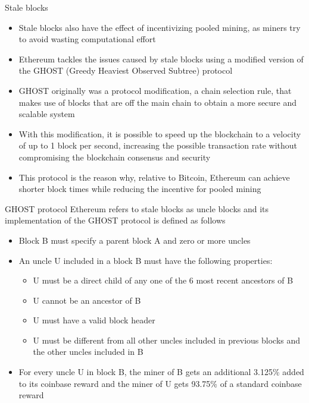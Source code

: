 \documentclass[10pt]{beamer}
\begin{document}

\begin{frame}{Stale blocks}
	\begin{itemize}

		\item Stale blocks also have the effect of incentivizing pooled mining, as miners try to avoid wasting computational effort
		\item Ethereum tackles the issues caused by stale blocks using a modified version of the GHOST (Greedy Heaviest Observed Subtree) protocol
		\item GHOST originally was a protocol modification, a chain selection rule, that makes use of blocks that are off the main chain to obtain a more secure and scalable system
		\item With this modification, it is possible to speed up the blockchain to a velocity of up to 1 block per second, increasing the possible transaction rate without compromising the blockchain consensus and security
		\item This protocol is the reason why, relative to Bitcoin, Ethereum can achieve shorter block times while reducing the incentive for pooled mining
	\end{itemize}
\end{frame}



\begin{frame}{GHOST protocol}
	Ethereum refers to stale blocks as uncle blocks and its implementation of the GHOST protocol is defined as follows
	\begin{itemize}
		\item Block B must specify a parent block A and zero or more uncles
		\item An uncle U included in a block B must have the following properties:
		\begin{itemize}
			\item U must be a direct child of any one of the 6 most recent ancestors of B
			\item U cannot be an ancestor of B
			\item U must have a valid block header
			\item U must be different from all other uncles included in previous blocks and the other uncles included in B
		\end{itemize}
		\item For every uncle U in block B, the miner of B gets an additional 3.125\% added to its coinbase reward and the miner of U gets 93.75\% of a standard coinbase reward
	\end{itemize}
\end{frame}
\end{document}
